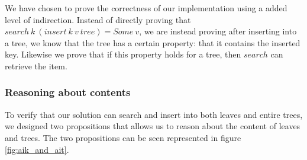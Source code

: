 We have chosen to prove the correctness of our implementation using a added level of indirection. Instead of directly proving that $search~k~(insert~k~v~ tree) = Some~v$, we are instead proving after inserting into a tree, we know that the tree has a certain property: that it contains the inserted key. Likewise we prove that if this property holds for a tree, then $search$ can retrieve the item.

\subsubsection{Reasoning about contents}
To verify that our solution can search and insert into both leaves and entire trees, we designed two propositions that allows us to reason about the content of leaves and trees. The two propositions can be seen represented in figure \ref{fig:aik_and_ait}. 

